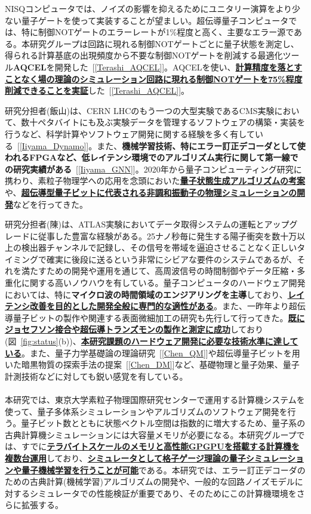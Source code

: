 \documentclass[11pt,a4j,dvipdfmx]{jarticle} 					%
\newcommand{\研究課題名}{誤り耐性量子コンピュータに向けた誤り訂正技術の開発(仮)}
\newcommand{\研究機関名}{東京大学}
\newcommand{\研究代表者氏名}{寺師弘二}
\newcommand{\研究期間の最終元号年度}{10}  %
\newcommand{\mybf}[1]{{\bfseries\sffamily#1}}
\begin{document}
NISQコンピュータでは、ノイズの影響を抑えるためにユニタリー演算をより少ない量子ゲートを使って実装することが望ましい。超伝導量子コンピュータでは、特に制御NOTゲートのエラーレートが1\%程度と高く、主要なエラー源である。本研究グループは回路に現れる制御NOTゲートごとに量子状態を測定し、得られる計算基底の出現頻度から不要な制御NOTゲートを削減する最適化ツール\mybf{AQCEL}を開発した~[\ref{Terashi_AQCEL}]。AQCELを使い、\mybf{\ul{計算精度を落とすことなく場の理論のシミュレーション回路に現れる制御NOTゲートを75\%程度削減できることを実証}}した~[\ref{Terashi_AQCEL}]。

研究分担者(飯山)は、CERN LHCのもう一つの大型実験であるCMS実験において、数十ペタバイトにも及ぶ実験データを管理するソフトウェアの構築・実装を行うなど、科学計算やソフトウェア開発に関する経験を多く有している~[\ref{Iiyama_Dynamo}]。また、\mybf{機械学習技術、特にエラー訂正デコーダとして使われるFPGAなど、低レイテンシ環境でのアルゴリズム実行に関して第一線での研究実績がある}~[\ref{Iiyama_GNN}]。2020年から量子コンピューティング研究に携わり、素粒子物理学への応用を念頭においた\mybf{\ul{量子状態生成アルゴリズムの考案}}や、\mybf{\ul{超伝導型量子ビットに代表される非調和振動子の物理シミュレーションの開発}}などを行ってきた。

研究分担者(陳)は、ATLAS実験においてデータ取得システムの運転とアップグレードに従事した豊富な経験がある。25ナノ秒毎に発生する陽子衝突を数十万以上の検出器チャンネルで記録し、その信号を帯域を逼迫させることなく正しいタイミングで確実に後段に送るという非常にシビアな要件のシステムであるが、それを満たすための開発や運用を通じて、高周波信号の時間制御やデータ圧縮・多重化に関する高いノウハウを有している。量子コンピュータのハードウェア開発においては、特に\mybf{マイクロ波の時間領域のエンジアリングを主導}しており、\mybf{\ul{レイテンシ改善を目的とした開発全般に専門的な適性がある}}。また、一昨年より超伝導量子ビットの製作や関連する表面微細加工の研究も先行して行ってきた。\mybf{\ul{既にジョセフソン接合や超伝導トランズモンの製作と測定に成功}}しており(図~\ref{fig:status}(b))、\mybf{\ul{本研究課題のハードウェア開発に必要な技術水準に達している}}。また、量子力学基礎論の理論研究~[\ref{Chen_QM}]や超伝導量子ビットを用いた暗黒物質の探索手法の提案~[\ref{Chen_DM}]など、基礎物理と量子効果、量子計測技術などに対しても鋭い感覚を有している。\vspace{-2mm}\\


\\
本研究では、東京大学素粒子物理国際研究センターで運用する計算機システムを使って、量子多体系シミュレーションやアルゴリズムのソフトウェア開発を行う。量子ビット数とともに状態ベクトル空間は指数的に増大するため、量子系の古典計算機シミュレーションには大容量メモリが必要になる。本研究グループでは、すでに\mybf{\ul{テラバイトスケールのメモリと高性能GPGPUを搭載する計算機を複数台運用}}しており、\mybf{\ul{シミュレータとして格子ゲージ理論の量子シミュレーションや量子機械学習を行うことが可能}}である。本研究では、エラー訂正デコーダのための古典計算(機械学習)アルゴリズムの開発や、一般的な回路ノイズモデルに対するシミュレータでの性能検証が重要であり、そのためにこの計算機環境をさらに拡張する。
\end{document}
